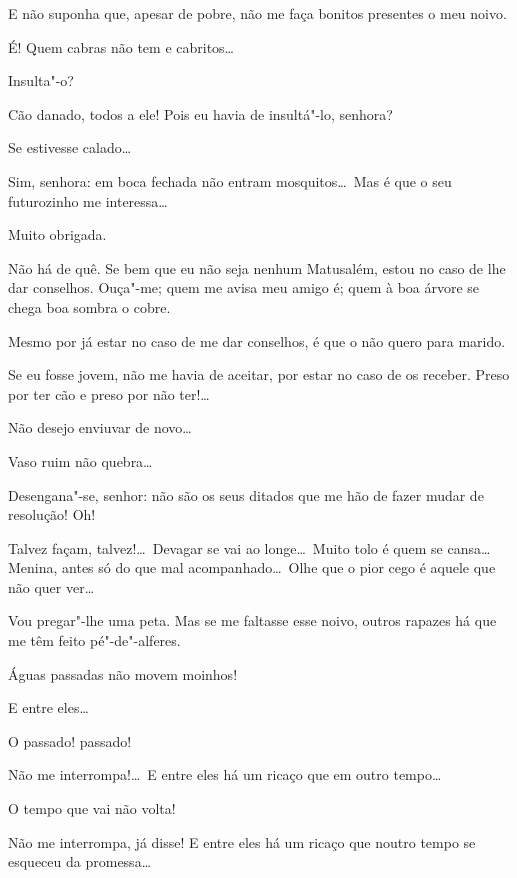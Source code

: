   E não suponha que, apesar de pobre, não me faça bonitos presentes
o meu noivo.

  É! Quem cabras não tem e cabritos\ldots

  Insulta"-o?

  Cão danado, todos a ele! Pois eu havia de insultá"-lo, senhora?

  Se estivesse calado\ldots

  Sim, senhora: em boca fechada não entram mosquitos\ldots\ Mas é
que o seu futurozinho me interessa\ldots

  Muito obrigada. 

  Não há de quê. Se bem que eu não seja nenhum Matusalém, estou no
caso de lhe dar conselhos. Ouça"-me; quem me avisa meu amigo é; quem à boa árvore
se chega boa sombra o cobre.

  Mesmo por já estar no caso de me dar conselhos, é que o não quero
para marido.

  Se eu fosse jovem, não me havia de aceitar, por estar no caso de
os receber. Preso por ter cão e preso por não ter!\ldots

  Não desejo enviuvar de novo\ldots

  Vaso ruim não quebra\ldots

  Desengana"-se, senhor: não são os seus ditados que me hão de fazer
mudar de resolução!  Oh!

  Talvez façam, talvez!\ldots\ Devagar se
vai ao longe\ldots\ Muito tolo é quem se cansa\ldots\  Menina,
antes só do que mal acompanhado\ldots\ Olhe que o pior cego é aquele que não
quer ver\ldots

   Vou pregar"-lhe uma peta.   Mas se me
faltasse esse noivo, outros rapazes há que me têm feito pé"-de"-alferes.

  Águas passadas não movem moinhos!

  E entre eles\ldots

 O passado! passado!

  Não me interrompa!\ldots\ E entre eles há um ricaço que em outro
tempo\ldots

 O tempo que vai não volta!

  Não me interrompa, já disse! E entre eles há um ricaço que noutro
tempo se esqueceu da promessa\ldots

